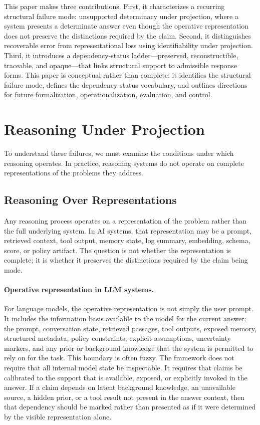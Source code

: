 \documentclass[11pt]{article}
\begin{document}
This paper makes three contributions. First, it characterizes a recurring structural failure mode: unsupported determinacy under projection, where a system presents a determinate answer even though the operative representation does not preserve the distinctions required by the claim. Second, it distinguishes recoverable error from representational loss using identifiability under projection. Third, it introduces a dependency-status ladder---preserved, reconstructible, traceable, and opaque---that links structural support to admissible response forms. This paper is conceptual rather than complete: it identifies the structural failure mode, defines the dependency-status vocabulary, and outlines directions for future formalization, operationalization, evaluation, and control.

\section{Reasoning Under Projection}

To understand these failures, we must examine the conditions under which reasoning operates. In practice, reasoning systems do not operate on complete representations of the problems they address.

\subsection{Reasoning Over Representations}

Any reasoning process operates on a representation of the problem rather than the full underlying system. In AI systems, that representation may be a prompt, retrieved context, tool output, memory state, log summary, embedding, schema, score, or policy artifact. The question is not whether the representation is complete; it is whether it preserves the distinctions required by the claim being made.

\paragraph{Operative representation in LLM systems.}
For language models, the operative representation is not simply the user prompt. It includes the information basis available to the model for the current answer: the prompt, conversation state, retrieved passages, tool outputs, exposed memory, structured metadata, policy constraints, explicit assumptions, uncertainty markers, and any prior or background knowledge that the system is permitted to rely on for the task. This boundary is often fuzzy. The framework does not require that all internal model state be inspectable. It requires that claims be calibrated to the support that is available, exposed, or explicitly invoked in the answer. If a claim depends on latent background knowledge, an unavailable source, a hidden prior, or a tool result not present in the answer context, then that dependency should be marked rather than presented as if it were determined by the visible representation alone.
\end{document}
